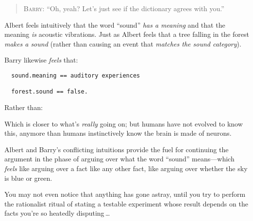 {\begin{quotation}
{
 \textsc{Barry}: ``Oh, yeah? Let's just see
 if the dictionary agrees with you.''}
\end{quotation}


 Albert feels intuitively that the word
``sound'' \textit{has a meaning} and
that the meaning \textit{is} acoustic vibrations. Just as Albert feels
that a tree falling in the forest \textit{makes a sound} (rather than
causing an event that \textit{matches the sound category}).


 Barry likewise \textit{feels} that:

\begin{verbatim}
  sound.meaning == auditory experiences

  forest.sound == false.
\end{verbatim}


 Rather than:



 Which is closer to what's \textit{really} going
on; but humans have not evolved to know this, anymore than humans
instinctively know the brain is made of neurons.


 Albert and Barry's conflicting intuitions provide
the fuel for continuing the argument in the phase of arguing over what
the word ``sound'' means---which
\textit{feels} like arguing over a fact like any other fact, like
arguing over whether the sky is blue or green.


 You may not even notice that anything has gone astray, until you
try to perform the rationalist ritual of stating a testable experiment
whose result depends on the facts you're so heatedly
disputing\,\ldots

\myendsectiontext



}
